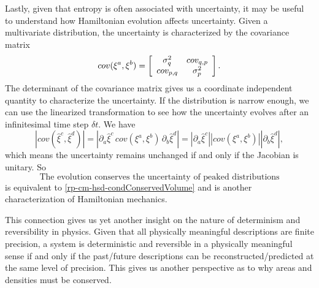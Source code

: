 Lastly, given that entropy is often associated with uncertainty, it may be useful to understand how Hamiltonian evolution affects uncertainty. Given a multivariate distribution, the uncertainty is characterized by the covariance matrix
\begin{equation}
	cov(\xi^a, \xi^b) = \left[\begin{array}{ c c }
		\sigma^2_q & cov_{q, p} \\
		cov_{p, q} & \sigma^2_p \\
	\end{array} \right].
\end{equation}
The determinant of the covariance matrix gives us a coordinate independent quantity to characterize the uncertainty. If the distribution is narrow enough, we can use the linearized transformation to see how the uncertainty evolves after an infinitesimal time step $\delta t$. We have
\begin{equation}
	\left| cov(\hat{\xi}^c, \hat{\xi}^d) \right| = \left| \partial_a \hat{\xi}^c  \, cov(\xi^a, \xi^b) \, \partial_b \hat{\xi}^d  \right| = \left| \partial_a \hat{\xi}^c \right| \left| cov(\xi^a, \xi^b) \right| \left| \partial_b \hat{\xi}^d  \right|,
\end{equation}
which means the uncertainty remains unchanged if and only if the Jacobian is unitary. So
\begin{equation}\label{rp-cm-hsd-condUncertainty}
	\tag{HM-12}
	\text{The evolution conserves the uncertainty of peaked distributions}	
\end{equation}
is equivalent to \ref{rp-cm-hsd-condConservedVolume} and is another characterization of Hamiltonian mechanics.

This connection gives us yet another insight on the nature of determinism and reversibility in physics. Given that all physically meaningful descriptions are finite precision, a system is deterministic and reversible in a physically meaningful sense if and only if the past/future descriptions can be reconstructed/predicted at the same level of precision. This gives us another perspective as to why areas and densities must be conserved.

